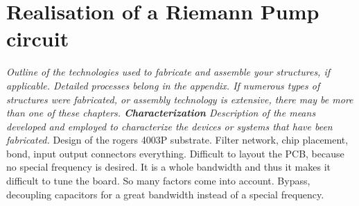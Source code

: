\chapter{Realisation of a Riemann Pump circuit}
\textit{Outline of the technologies used to fabricate and assemble your structures, if applicable. Detailed processes belong in the appendix. If numerous types of structures were fabricated, or assembly technology is extensive, there may be more than one of these chapters. \textbf{Characterization} Description of the means developed and employed to characterize the devices or systems that have been fabricated.}
Design of the rogers 4003P substrate. Filter network, chip placement, bond, input output connectors everything. Difficult to layout the PCB, because no special frequency is desired. It is a whole bandwidth and thus it makes it difficult to tune the board. So many factors come into account. Bypass, decoupling capacitors for a great bandwidth instead of a special frequency. 
